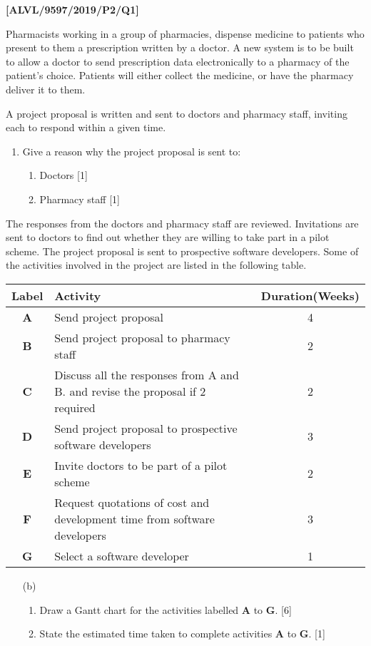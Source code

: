 \item \textbf{{[}ALVL/9597/2019/P2/Q1{]} }

Pharmacists working in a group of pharmacies, dispense medicine to
patients who present to them a prescription written by a doctor. A
new system is to be built to allow a doctor to send prescription data
electronically to a pharmacy of the patient's choice. Patients will
either collect the medicine, or have the pharmacy deliver it to them. 

A project proposal is written and sent to doctors and pharmacy staff,
inviting each to respond within a given time. 
\begin{enumerate}
\item Give a reason why the project proposal is sent to: 
\begin{enumerate}
\item Doctors \hfill{}{[}1{]}
\item Pharmacy staff \hfill{}{[}1{]}
\end{enumerate}
\end{enumerate}
The responses from the doctors and pharmacy staff are reviewed. Invitations
are sent to doctors to find out whether they are willing to take part
in a pilot scheme. The project proposal is sent to prospective software
developers. Some of the activities involved in the project are listed
in the following table. 
\begin{center}
\begin{tabular}{|c|l|c|}
\hline 
Label & \hspace{0.25\columnwidth}Activity & Duration(Weeks)\tabularnewline
\hline 
\textbf{A} & Send project proposal  & 4\tabularnewline
\hline 
\textbf{B} & Send project proposal to pharmacy staff & 2\tabularnewline
\hline 
\textbf{C} & Discuss all the responses from A and B. and revise the proposal if
2 required & 2\tabularnewline
\hline 
\textbf{D} & Send project proposal to prospective software developers & 3\tabularnewline
\hline 
\textbf{E} & Invite doctors to be part of a pilot scheme & 2\tabularnewline
\hline 
\textbf{F} & Request quotations of cost and development time from software developers & 3\tabularnewline
\hline 
\textbf{G} & Select a software developer  & 1\tabularnewline
\hline 
\end{tabular}
\par\end{center}
\begin{enumerate}
\item[(b)] {}
\begin{enumerate}
\item Draw a Gantt chart for the activities labelled \textbf{A} to \textbf{G}.
\hfill{}{[}6{]}
\item State the estimated time taken to complete activities \textbf{A} to
\textbf{G}. \hfill{}{[}1{]}
\end{enumerate}
\end{enumerate}
